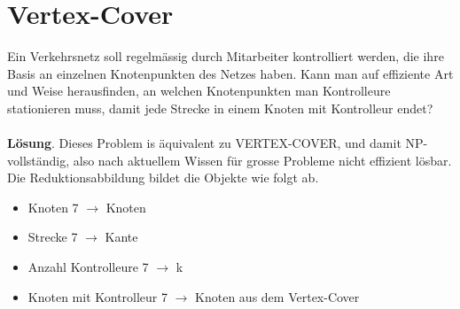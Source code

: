 \section{Vertex-Cover}
Ein Verkehrsnetz soll regelmässig durch Mitarbeiter kontrolliert werden, die ihre Basis an einzelnen Knotenpunkten des Netzes haben. Kann man auf effiziente Art und Weise herausfinden, an welchen Knotenpunkten man Kontrolleure stationieren muss, damit jede Strecke in einem Knoten mit Kontrolleur endet?\\
\\
\textbf{Lösung}. Dieses Problem is äquivalent zu VERTEX-COVER, und damit NP-vollständig, also nach aktuellem Wissen für grosse Probleme nicht effizient lösbar. Die Reduktionsabbildung bildet die Objekte wie folgt ab.

\begin{itemize}
    \item Knoten 7 $\rightarrow$ Knoten
    \item Strecke 7 $\rightarrow$ Kante
    \item Anzahl Kontrolleure 7 $\rightarrow$ k
    \item Knoten mit Kontrolleur 7 $\rightarrow$ Knoten aus dem Vertex-Cover
\end{itemize}